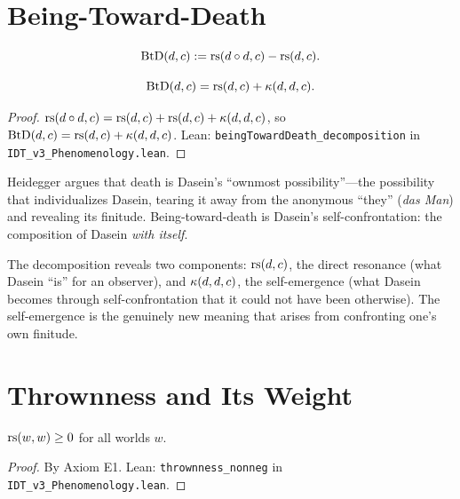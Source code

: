 \section{Being-Toward-Death}

\begin{definition}
\label{def:being-toward-death}
\[
\mathrm{BtD}(d, c) := \mathrm{rs}(d \circ d, c) - \mathrm{rs}(d, c).
\]
\end{definition}

\begin{theorem}
\label{thm:btd-decomp}
\[
\mathrm{BtD}(d, c) = \mathrm{rs}(d, c) + \kappa(d, d, c).
\]
\end{theorem}

\begin{proof}
$\mathrm{rs}(d \circ d, c) = \mathrm{rs}(d,c) + \mathrm{rs}(d,c) + \kappa(d,d,c)$, so
$\mathrm{BtD}(d,c) = \mathrm{rs}(d,c) + \kappa(d,d,c)$.
Lean: \texttt{beingTowardDeath\_decomposition} in \texttt{IDT\_v3\_Phenomenology.lean}.
\end{proof}

\begin{interpretation}
Heidegger argues that death is Dasein's ``ownmost possibility''---the possibility
that individualizes Dasein, tearing it away from the anonymous ``they''
(\textit{das Man}) and revealing its finitude. Being-toward-death is Dasein's
self-confrontation: the composition of Dasein \emph{with itself}.

The decomposition reveals two components: $\mathrm{rs}(d, c)$, the direct resonance
(what Dasein ``is'' for an observer), and $\kappa(d, d, c)$, the self-emergence
(what Dasein becomes through self-confrontation that it could not have been
otherwise). The self-emergence is the genuinely new meaning that arises from
confronting one's own finitude.
\end{interpretation}

\section{Thrownness and Its Weight}

\begin{theorem}
\label{thm:thrownness-nonneg}
$\mathrm{rs}(w, w) \geq 0$ for all worlds $w$.
\end{theorem}

\begin{proof}
By Axiom E1.
Lean: \texttt{thrownness\_nonneg} in \texttt{IDT\_v3\_Phenomenology.lean}.
\end{proof}

